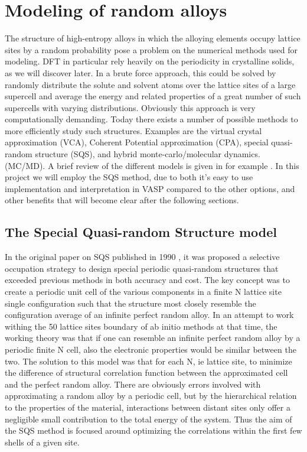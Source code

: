 \chapter{Modeling of random alloys}
\label{sec:SQS}

The structure of high-entropy alloys in which the alloying elements occupy lattice sites by a random probability pose a problem on the numerical methods used for modeling. DFT in particular rely heavily on the periodicity in crystalline solids, as we will discover later. 
In a brute force approach, this could be solved by randomly distribute the solute and solvent atoms over the lattice sites of a large supercell and average the energy and related properties of a great number of such supercells with varying distributions. Obviously this approach is very computationally demanding. Today there exists a number of possible methods to more efficiently study such structures. Examples are the virtual crystal approximation (VCA), Coherent Potential approximation (CPA), special quasi-random structure (SQS), and hybrid monte-carlo/molecular dynamics. (MC/MD). A brief review of the different models is given in for example \cite{sqsIntro}. In this project we will employ the SQS method, due to both it's easy to use implementation and interpretation in VASP compared to the other options, and other benefits that will become clear after the following sections.             

\section{The Special Quasi-random Structure model}
In the original paper on SQS published in 1990 \cite{sqsfull}, it was proposed a selective occupation strategy to design special periodic quasi-random structures that exceeded previous methods in both accuracy and cost. The key concept was to create a periodic unit cell of the various components in a finite N lattice site single configuration such that the structure most closely resemble the configuration average of an infinite perfect random alloy. In an attempt to work withing the 50 lattice sites boundary of ab initio methods at that time, the working theory was that if one can resemble an infinite perfect random alloy by a periodic finite N cell, also the electronic properties would be similar between the two. The solution to this model was that for each N, ie lattice site, to minimize the difference of structural correlation function between the approximated cell and the perfect random alloy. There are obviously errors involved with approximating a random alloy by a periodic cell, but by the hierarchical relation to the properties of the material, interactions between distant sites only offer a negligible small contribution to the total energy of the system. Thus the aim of the SQS method is focused around optimizing the correlations within the first few shells of a given site. 

